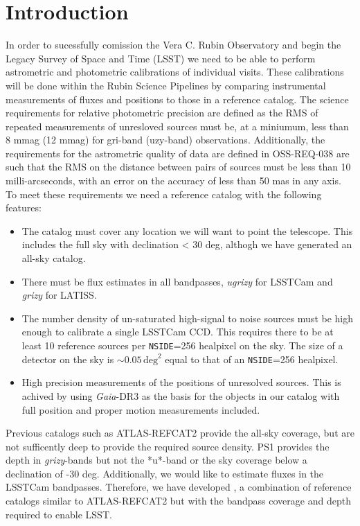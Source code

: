 \section{Introduction}
In order to sucessfully comission the Vera C. Rubin Observatory and begin the Legacy Survey of Space and Time (LSST) we need to be able to perform astrometric and photometric calibrations of individual visits. 
These calibrations will be done within the Rubin Science Pipelines by comparing instrumental measurements of fluxes and positions to those in a reference catalog.
The science requirements for relative photometric precision \citep[OSS-REQ-0387;][]{LSE-30} are defined as the RMS of repeated measurements of unresloved sources must be, at a miniumum, less than 8 mmag (12 mmag) for gri-band (uzy-band) observations. 
Additionally, the requirements for the astrometric quality of data are defined in OSS-REQ-038 are such that the RMS on the distance between pairs of sources must be less than 10 milli-arcseconds, with an error on the accuracy of less than 50 mas in any axis. 
To meet these requirements we need a reference catalog with the following features:

\begin{itemize}
    \item The catalog must cover any location we will want to point the telescope. 
    This includes the full sky with declination < 30 deg, althogh we have generated an all-sky catalog. 
    \item There must be flux estimates in all bandpasses, \textit{ugrizy} for LSSTCam and \textit{grizy} for LATISS. 
    \item The number density of un-saturated high-signal to noise sources must be high enough to calibrate a single LSSTCam CCD. 
    This requires there to be at least 10 reference sources per \texttt{NSIDE}=256 healpixel on the sky.
    The size of a detector on the sky is $\sim 0.05\,\mathrm{deg}^2$  equal to that of an \texttt{NSIDE}=256 healpixel. 
    \item High precision measurements of the positions of unresolved sources. 
    This is achived by using \textit{Gaia}-DR3 as the basis for the objects in our catalog with full position and proper motion measurements included. 
    
\end{itemize} 

Previous catalogs such as ATLAS-REFCAT2 \citep{Tonry:2018} provide the all-sky coverage, but are not sufficently deep to provide the required source density. 
PS1 \citep{Chambers:2016} provides the depth in \emph{grizy}-bands but not the *u*-band or the sky coverage below a declination of -30 deg. 
Additionally, we would like to estimate fluxes in the LSSTCam bandpasses. 
Therefore, we have developed \monster, a combination of reference catalogs similar to ATLAS-REFCAT2 but with the bandpass coverage and depth required to enable LSST. 

